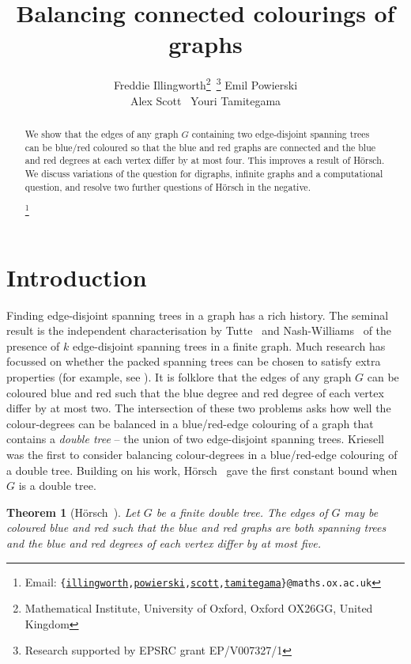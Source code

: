\documentclass[11pt, reqno, a4paper]{article}
\title{Balancing connected colourings of graphs}
\author{
Freddie Illingworth\footnote{Mathematical Institute, University of Oxford,
Oxford OX2\thinspace6GG, United Kingdom}~\footnote{Research supported by EPSRC grant EP/V007327/1} \;
Emil Powierski\protect\footnotemark[1] \;
\\Alex Scott\protect\footnotemark[1]~\footnotemark[2] \;
Youri Tamitegama\protect\footnotemark[1]}
\date{}
\newtheorem{theorem}{Theorem}
\theoremstyle{definition}
\numberwithin{equation}{section}
\newcommand\blfootnote[1]{
  \begingroup
  \renewcommand\thefootnote{}\footnote{#1}
  \addtocounter{footnote}{-1}
  \endgroup
}
\begin{document}
\maketitle
\begin{abstract}
We show that the edges of any graph $G$ containing two edge-disjoint spanning trees can be blue/red coloured so that the blue and red graphs are connected and the blue and red degrees at each vertex differ by at most four.
This improves a result of H\"orsch.
We discuss variations of the question for digraphs, infinite graphs and a computational question, and resolve two further questions of H\"{o}rsch in the negative.
\blfootnote{Email: \texttt{\{\href{mailto:illingworth@maths.ox.ac.uk}{illingworth},\href{mailto:powierski@maths.ox.ac.uk}{powierski},\href{mailto:scott@maths.ox.ac.uk}{scott},\href{mailto:tamitegama@maths.ox.ac.uk}{tamitegama}\}@maths.ox.ac.uk}}
\end{abstract}


\section{Introduction}

Finding edge-disjoint spanning trees in a graph has a rich history. 
The seminal result is the independent characterisation by Tutte~\cite{tutte1961problem} and Nash-Williams~\cite{nash1961edge} of the presence of $k$ edge-disjoint spanning trees in a finite graph. Much research has focussed on whether the packed spanning trees can be chosen to satisfy extra properties (for example, see \cite{bang2016complexity,bessy2021fpt,chuzhoy2020packing}). 
It is folklore that the edges of any graph $G$ can be coloured blue and red such that the blue degree and red degree of each vertex differ by at most two. 
The intersection of these two problems asks how well the colour-degrees can be balanced in a blue/red-edge colouring of a graph that contains a \emph{double tree} -- the union of two edge-disjoint spanning trees. Kriesell~\cite{kriesell2011balancing} was the first to consider balancing colour-degrees in a blue/red-edge colouring of a double tree.
Building on his work, H\"{o}rsch~\cite{horsch2021globally} gave the first constant bound when $G$ is a double tree.

\begin{theorem}[H\"{o}rsch~\cite{horsch2021globally}]\label{thm:horsch}
	Let $G$ be a finite double tree. 
	The edges of $G$ may be coloured blue and red such that the blue and red graphs are both spanning trees and the blue and red degrees of each vertex differ by at most five.
\end{theorem}
\end{document}
